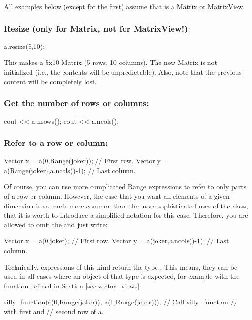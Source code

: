 All examples below (except for the first) assume that  is a
Matrix or MatrixView.

\subsubsection{Resize (only for Matrix, not for MatrixView!):}
\begin{code}
a.resize(5,10);
\end{code}
This makes  a 5x10 Matrix (5 rows, 10 columns). The new Matrix
is not initialized (i.e., the contents will be unpredictable). Also,
note that the previous content will be completely lost.

\subsubsection{Get the number of rows or columns:}
\begin{code}
cout << a.nrows();
cout << a.ncols();
\end{code}

\subsubsection{Refer to a row or column:}
\begin{code}
Vector x = a(0,Range(joker));           // First row.
Vector y = a(Range(joker),a.ncols()-1); // Last column.
\end{code}
Of course, you can use more complicated Range expressions to refer to
only parts of a row or column. However, the case that you want all
elements of a given dimension is so
much more common than the more sophisticated uses of the
 class, that it is worth to introduce a simplified
notation for this case. Therefore, you are allowed to
omit the  and just write:
\begin{code}
Vector x = a(0,joker);           // First row.
Vector y = a(joker,a.ncols()-1); // Last column.
\end{code}

Technically, expressions of this kind return the type
. This means, they can be used in all cases
where an object of that type is expected, for example with the
function defined in Section \ref{sec:vector_views}:

\begin{code}
silly_function(a(0,Range(joker)),
               a(1,Range(joker))); // Call silly_function
                                   // with first and
                                   // second row of a.
\end{code}



